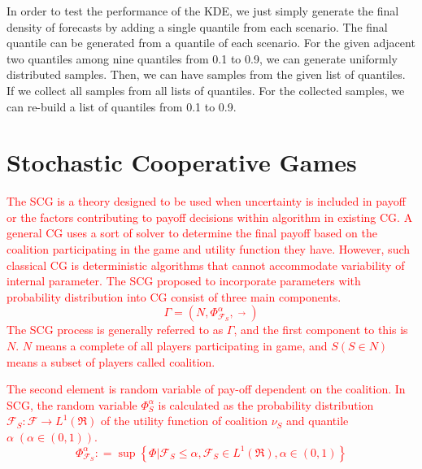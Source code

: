 \documentclass[journal]{IEEEtran} %
\begin{document}
In order to test the performance of the KDE, we just simply generate the final density of forecasts by adding a single quantile from each scenario. The final quantile can be generated from a quantile of each scenario. For the given adjacent two quantiles among nine quantiles from 0.1 to 0.9, we can generate uniformly distributed samples. Then, we can have samples from the given list of quantiles. If we collect all samples from all lists of quantiles. For the collected samples, we can re-build a list of quantiles from 0.1 to 0.9.


\section{Stochastic Cooperative Games}
\textcolor{red}{The SCG is a theory designed to be used when uncertainty is included in payoff or the factors contributing to payoff decisions within algorithm in existing CG. A general CG uses a sort of solver to determine the final payoff based on the coalition participating in the game and utility function they have. However, such classical CG is deterministic algorithms that cannot accommodate variability of internal parameter. The SCG proposed to incorporate parameters with probability distribution into CG consist of three main components.
\begin{equation}
\Gamma  = (\mathit{N},{\Phi_{\mathcal{F}_S}^\alpha},{\mathop {{\Delta _i}}\limits^ \to})
\end{equation}
The SCG process is generally referred to as $\Gamma$, and the first component to this is $N$. $N$ means a complete of all players participating in game, and $S (S \in N)$ means a subset of players called coalition.}

\textcolor{red}{The second element is random variable of pay-off dependent on the coalition. In SCG, the random variable ${\Phi_S^\alpha}$ is calculated as the probability distribution ${\mathcal{F}_S}: {\mathcal{F}} \to {L^1}(\Re )$ of the utility function of coalition $\nu_S$ and quantile $\alpha\;(\alpha \in (0, 1))$.
\begin{equation}
\Phi _{{\mathcal{F}_S}}^\alpha : = \sup \left\{ {\Phi |{\mathcal{F}_S} \le \alpha ,{\mathcal{F}_S} \in {L^1}(\Re ),\alpha  \in (0,1)} \right\}
\end{equation}
}
\end{document}
